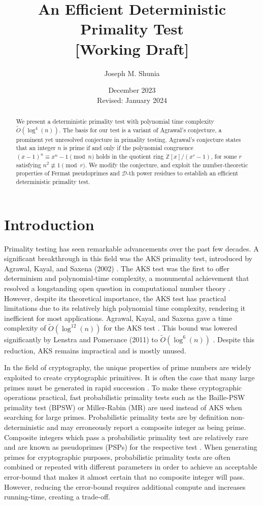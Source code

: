 \documentclass{article}
\title{An Efficient Deterministic Primality Test \\ \small [Working Draft] \normalsize}
\author{Joseph M. Shunia}
\date{December 2023 \\ \small Revised: January 2024 \normalsize}
\theoremstyle{plain}
\theoremstyle{definition}
\begin{document}
\maketitle

\begin{abstract}
We present a deterministic primality test with polynomial time complexity $\tilde{O}(\log^4(n))$. The basis for our test is a variant of Agrawal's conjecture, a prominent yet unresolved conjecture in primality testing. Agrawal's conjecture states that an integer $n$ is prime if and only if the polynomial congruence $(x - 1)^n \equiv x^n - 1 \pmod{n}$ holds in the quotient ring $\mathbb{Z}[x]/(x^r - 1)$, for some $r$ satisfying $n^2 \not\equiv 1 \pmod{r}$. We modify the conjecture, and exploit the number-theoretic properties of Fermat pseudoprimes and $\mathcal{D}$-th power residues to establish an efficient deterministic primality test.
\end{abstract}

\section{Introduction}

Primality testing has seen remarkable advancements over the past few decades. A significant breakthrough in this field was the AKS primality test, introduced by Agrawal, Kayal, and Saxena (2002) \cite{aks2002}. The AKS test was the first to offer determinism and polynomial-time complexity, a monumental achievement that resolved a longstanding open question in computational number theory \cite{goldreich2008}. However, despite its theoretical importance, the AKS test has practical limitations due to its relatively high polynomial time complexity, rendering it inefficient for most applications. Agrawal, Kayal, and Saxena gave a time complexity of $\tilde{O}(\log^{12}(n))$ for the AKS test \cite{aks2002}. This bound was lowered significantly by Lenstra and Pomerance (2011) to $\tilde{O}(\log^6(n))$ \cite{lenstra2011}. Despite this reduction, AKS remains impractical and is mostly unused.

In the field of cryptography, the unique properties of prime numbers are widely exploited to create cryptographic primitives. It is often the case that many large primes must be generated in rapid succession \cite{lenstra1987}. To make these cryptographic operations practical, fast probabilistic primality tests such as the Baille-PSW primality test (BPSW) \cite{baillie1980} or Miller-Rabin (MR) \cite{rabin1980} \cite{miller1976} are used instead of AKS when searching for large primes. Probabilistic primality tests are by definition non-deterministic and may erroneously report a composite integer as being prime. Composite integers which pass a probabilistic primality test are relatively rare and are known as pseudoprimes (PSPs) for the respective test \cite{wagstaff1983}. When generating primes for cryptographic purposes, probabilistic primality tests are often combined or repeated with different parameters in order to achieve an acceptable error-bound that makes it almost certain that no composite integer will pass. However, reducing the error-bound requires additional compute and increases running-time, creating a trade-off.
\end{document}
